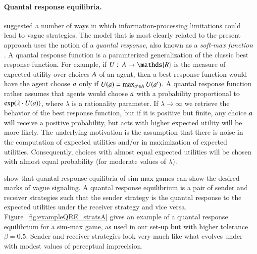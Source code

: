 \documentclass[fleqn,reqno,10pt]{article}
\newcommand{\rdd}{\acro{rdd}} %
\newcommand{\toler}{\ensuremath{\beta}} %
\begin{document}
\paragraph{Quantal response equilibria.}
\citet{FrankeJager2010:Vagueness-Signa} suggested a number of ways in
which information-processing limitations could lead to vague
strategies. The model that is most clearly related to the present
approach uses the notion of a \emph{quantal response}, also known as a
\emph{soft-max function}
\citep[e.g.][]{Luce1959:Individual-Choi,McFadden1976:Quantal-Choice-,GoereeHolt2008:Quantal-Respons}. A
quantal response function is a paramterized generalization of the
classic best response function. For example, if $U \mycolon \Acts
\rightarrow \mathds{R}$ is the measure of expected utility over
choices $A$ of an agent, then a best response function would have
the agent choose $a$ only if $U(a) = \max_{a^\prime \in A}
U(a^\prime)$. A quantal response function rather assumes that agents would
choose $a$ with a probability proportional to $\operatorname{exp}(\lambda \cdot
U(a))$, where $\lambda$ is a rationality parameter. If $\lambda
\rightarrow \infty$ we retrieve the behavior of the best response
function, but if it is positive but finite, any choice $a$ will
receive a positive probability, but acts with higher expected utility
will be more likely. The underlying motivation is the assumption that
there is noise in the computation of expected utilities and/or in
maximization of expected utilities. Consequently, choices with almost
equal expected utilities will be chosen with almost equal probability
(for moderate values of $\lambda$).

\citet{FrankeJager2010:Vagueness-Signa} show that quantal response
equilibria of sim-max games can show the desired marks of vague
signaling. A quantal response equilibrium is a pair of sender and
receiver strategies such that the sender strategy is the quantal
response to the expected utilities under the receiver strategy and
vice versa. Figure~\ref{fig:exampleQRE_stratsA} gives an example of a
quantal response equilibrium for a sim-max game, as used in our set-up
but with higher tolerance $\toler = 0.5$. Sender and receiver
strategies look very much like what evolves under \rdd with modest
values of perceptual imprecision.
\end{document}
